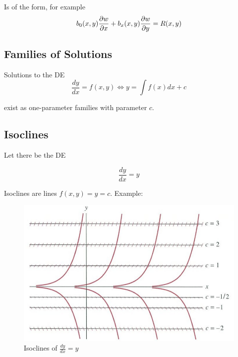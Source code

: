 \begin{definition}[Partial DE]
    Is of the form, for example
    \begin{equation}
        b_0(x,y)\frac{\partial w}{\partial x}+b_x(x,y)\frac{\partial w}{\partial y}=R(x,y)
    \end{equation}
\end{definition}

\subsection{Families of Solutions}

Solutions to the DE
\begin{equation}
    \frac{dy}{dx}=f(x,y)\Leftrightarrow y=\int f(x)dx+c
\end{equation}

exist as one-parameter families with parameter $c$.

\subsection{Isoclines}

Let there be the DE

\begin{equation}
    \frac{dy}{dx}=y
\end{equation}

Isoclines are lines $f(x,y)=y=c$. Example:

\begin{figure}[H]
    \centering
    \includegraphics[scale=0.75]{figures/Screen Shot 2021-09-27 at 3.25.57 PM.png}
    \caption{Isoclines of $\frac{dy}{dx}=y$}
\end{figure}

